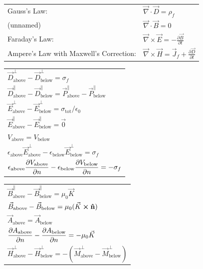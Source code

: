 \documentclass{article}
\newcommand{\ds}{\displaystyle}
\newcommand{\formbox}[2]{\begin{center} \begin{tcolorbox}[title = #1, boxrule=2pt,arc=3.4pt,boxsep=0mm] #2\end{tcolorbox}\end{center}}
\begin{document}
\begin{multicols*}{2}
{{\begin{tabular}{ m{12em} m{25em}  }
            Gauss's Law: & $\displaystyle \vec{\nabla} \cdot \vec{D} = \rho_f$\\
            (unnamed) & $\displaystyle \vec{\nabla} \cdot \vec{B} = 0$\\
            Faraday's Law: & $\displaystyle \vec{\nabla} \times \vec{E} = - \frac{\partial \vec{B}}{\partial t}$\\
            Ampere's Law with Maxwell's Correction: & $\displaystyle \vec{\nabla} \times \vec{H} = \vec{J}_f + \frac{\partial \vec{D}}{\partial t}$\\
        \end{tabular}}
    }
    \vfill \null \columnbreak
    \formbox{Boundary Conditions in Electrostatics}{
        {\renewcommand{\arraystretch}{1.75}%
        \begin{tabular}{ l }
            $\vec{D}_{\text{above}}^{\perp} - \vec{D}_{\text{below}}^{\perp}  = \sigma_f$\\
            $\vec{D}_{\text{above}}^{\parallel} - \vec{D}_{\text{below}}^{\parallel} = \vec{P}_{\text{above}}^{\parallel} - \vec{P}_{\text{below}}^{\parallel}$\\
            $\vec{E}_{\text{above}}^{\perp} - \vec{E}_{\text{below}}^{\perp}  = \sigma_{\text{tot}}/\epsilon_0$\\
            $\vec{E}_{\text{above}}^{\parallel} - \vec{E}_{\text{below}}^{\parallel}  = \vec{0}$\\
            $V_\text{above} = V_\text{below}$\\
            $\epsilon_\text{above}\vec{E}_\text{above}^\perp - \epsilon_\text{below}\vec{E}_\text{below}^\perp = \sigma_f$\\
            $\ds \epsilon_\text{above}\pdv{V_\text{above}}{n} - \epsilon_\text{below}\pdv{V_\text{below}}{n} = -\sigma_f$
        \end{tabular}}
    }
    \formbox{Boundary Conditions in Magnetostatics}{
        {\renewcommand{\arraystretch}{1.75}%
        \begin{tabular}{ l }
            $\vec{B}_\text{above}^\parallel - \vec{B}_\text{below}^\parallel = \mu_0\vec{K}$\\
            $\vec{B}_\text{above} - \vec{B}_\text{below} = \mu_0(\vec{K}\cross\vu{n})$\\
            $\vec{A}_\text{above} = \vec{A}_\text{below}$\\
            $\ds \pdv{A_\text{above}}{n} - \pdv{A_\text{below}}{n} = -\mu_0\vec{K}$\\
            $\vec{H}_\text{above}^\perp - \vec{H}_\text{below}^\perp = - (\vec{M}_\text{above}^\perp - \vec{M}_\text{below}^\perp) $\\

\end{tabular}}}
\end{multicols*}
\end{document}
